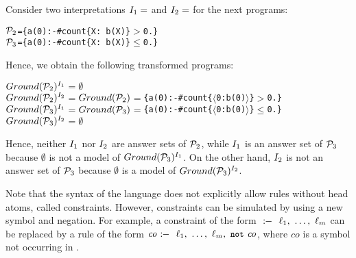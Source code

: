 \documentclass{tlp}
\begin{document}
\begin{example}\label{ex:simple-trans}
Consider two interpretations $I_1 =$  and $I_2 = $  for the next programs:
\begin{alltt}\small
 \(\pASa\) = \{a(0) :- #count\{X:\ b(X)\} \(>\) 0.\}
 \(\pASb\) = \{a(0) :- #count\{X:\ b(X)\} \(\leq\) 0.\}
\end{alltt}\normalsize
Hence, we obtain the following transformed programs:
\begin{alltt}\small
 \(\ground{\pASa}\sp{\iASa}\) \(=\) \(\emptyset\)
 \(\ground{\pASa}\sp{\iASb}\) \(=\) \(\ground{\pASa}\) \(=\) \{a(0) :- #count\{\(\langle\)0: b(0)\(\rangle\)\} \(>\) 0.\}
 \(\ground{\pASb}\sp{\iASa}\) \(=\) \(\ground{\pASb}\) \(=\) \{a(0) :- #count\{\(\langle\)0: b(0)\(\rangle\)\} \(\leq\) 0.\}
 \(\ground{\pASb}\sp{\iASb}\) \(=\) \(\emptyset\)
\end{alltt}\normalsize
Hence, neither $I_1$ nor $I_2$ are answer sets of ${\cal P}_2$, while $I_1$ is an answer set of ${\cal P}_3$ because $\emptyset$ is not a model of $Ground({\cal P}_3)^{I_1}$.
On the other hand, $I_2$ is not an answer set of ${\cal P}_3$ because $\emptyset$ is a model of $Ground({\cal P}_3)^{I_2}$.
\punto
\end{example}


Note that the syntax of the language does not explicitly allow rules without head atoms, called constraints.
However, constraints can be simulated by using a new symbol and negation.
For example, a constraint of the form $\derives\ \ell_1,\ \ldots,\ \ell_m$ can be replaced by a rule of the form $\mathit{co} \derives\ \ell_1,\ \ldots,\ \ell_m,\ \mytt{not}\ \mathit{co}$, where $\mathit{co}$ is a symbol not occurring in \p.
\end{document}
